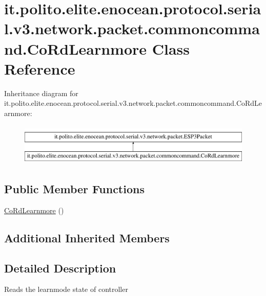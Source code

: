 \hypertarget{classit_1_1polito_1_1elite_1_1enocean_1_1protocol_1_1serial_1_1v3_1_1network_1_1packet_1_1commoncommand_1_1_co_rd_learnmore}{}\section{it.\+polito.\+elite.\+enocean.\+protocol.\+serial.\+v3.\+network.\+packet.\+commoncommand.\+Co\+Rd\+Learnmore Class Reference}
\label{classit_1_1polito_1_1elite_1_1enocean_1_1protocol_1_1serial_1_1v3_1_1network_1_1packet_1_1commoncommand_1_1_co_rd_learnmore}
Inheritance diagram for it.\+polito.\+elite.\+enocean.\+protocol.\+serial.\+v3.\+network.\+packet.\+commoncommand.\+Co\+Rd\+Learnmore\+:\begin{figure}[H]
\begin{center}
\leavevmode
\includegraphics[height=2.000000cm]{classit_1_1polito_1_1elite_1_1enocean_1_1protocol_1_1serial_1_1v3_1_1network_1_1packet_1_1commoncommand_1_1_co_rd_learnmore}
\end{center}
\end{figure}
\subsection*{Public Member Functions}
\begin{DoxyCompactItemize}
\item 
\hyperlink{classit_1_1polito_1_1elite_1_1enocean_1_1protocol_1_1serial_1_1v3_1_1network_1_1packet_1_1commoncommand_1_1_co_rd_learnmore_aa99c5ab55bdfdc9e42300e6cc22e6fa6}{Co\+Rd\+Learnmore} ()
\end{DoxyCompactItemize}
\subsection*{Additional Inherited Members}


\subsection{Detailed Description}
Reads the learnmode state of controller

